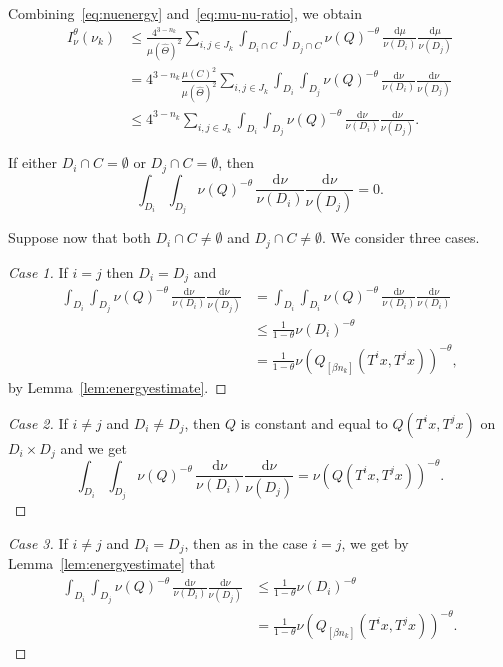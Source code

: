 \documentclass[10pt]{amsart}
\theoremstyle{definition}\newtheorem{defi}[theo]{Definition}\newtheorem{rema}[theo]{Remark}\newtheorem{exam}[theo]{Example}\newtheorem{exem}[theo]{Example}\newtheorem{nota}[theo]{Notation}
\newcommand*{\dd}{\mathrm{d}}
\newenvironment{step}{\begin{proof}}{\let\qed\relax \end{proof}}
\begin{document}
Combining~\eqref{eq:nuenergy} and~\eqref{eq:mu-nu-ratio}, we obtain
\begin{align*}
I_\nu^\theta (\nu_k) &\leq \frac{4^{3-n_k}}{\mu (\hat{\Theta})^2}
\sum_{i,j \in J_k} \int_{D_i \cap C} \int_{D_j \cap C} \nu (Q)^{-\theta} \, \frac{\dd \mu}{\nu (D_i)} \frac{\dd
\mu}{\nu (D_j)} \\ &= 4^{3-n_k} \frac{\mu(C)^2}{\mu (\hat{\Theta})^2} \sum_{i,j \in J_k} \int_{D_i} \int_{D_j} \nu (Q)^{-\theta} \, \frac{\dd \nu}{\nu (D_i)} \frac{\dd
\nu}{\nu (D_j)} \\ &\leq 4^{3-n_k} \sum_{i,j \in J_k} \int_{D_i}
\int_{D_j} \nu (Q)^{-\theta} \, \frac{\dd \nu}{\nu (D_i)}
\frac{\dd \nu}{\nu (D_j)}.
\end{align*}

If either $D_i \cap C = \emptyset$ or $D_j \cap C = \emptyset$, then
\[
\int_{D_i} \int_{D_j} \nu (Q)^{-\theta} \, \frac{\dd \nu}{\nu (D_i)} \frac{\dd \nu}{\nu (D_j)} = 0.
\]

Suppose now that both $D_i \cap C \neq \emptyset$ and $D_j \cap C \neq
\emptyset$. We consider three cases.

\begin{step}[Case 1]
If $i = j$ then $D_i = D_j$ and
\begin{align*}
\int_{D_i} \int_{D_j} \nu (Q)^{-\theta} \, \frac{\dd \nu}{\nu (D_i)} \frac{\dd \nu}{\nu (D_j)} &= \int_{D_i} \int_{D_i}
\nu (Q)^{-\theta} \, \frac{\dd \nu}{\nu (D_i)}
\frac{\dd \nu}{\nu (D_i)} \\ &\leq \frac{1}{1 - \theta} \nu (D_i)^{-\theta} \\ &= \frac{1}{1-\theta} \nu (Q_{[\beta n_k]} (T^i x, T^j x))^{-\theta},
\end{align*}
by Lemma~\ref{lem:energyestimate}.
\end{step}

\begin{step}[Case 2]
If $i \neq j$ and $D_i \neq D_j$, then $Q$ is constant and equal to $Q(T^i x, T^j x)$ on $D_i \times D_j$ and we get
\[
\int_{D_i} \int_{D_j} \nu (Q)^{-\theta} \, \frac{\dd \nu}{\nu (D_i)} \frac{\dd \nu}{\nu (D_j)} = \nu (Q (T^i x, T^j x))^{-\theta}.
\]
\end{step}

\begin{step}[Case 3]
If $i \neq j$ and $D_i = D_j$, then as in the case $i = j$, we get by Lemma~\ref{lem:energyestimate} that
\begin{align*}
\int_{D_i} \int_{D_j} \nu (Q)^{-\theta} \, \frac{\dd \nu}{\nu (D_i)} \frac{\dd \nu}{\nu (D_j)} & \leq \frac{1}{1-\theta}
\nu (D_i)^{-\theta} \\ &= \frac{1}{1-\theta} \nu (Q_{[\beta n_k]} (T^i x, T^j x))^{-\theta}.
\end{align*}
\end{step}
\end{document}
